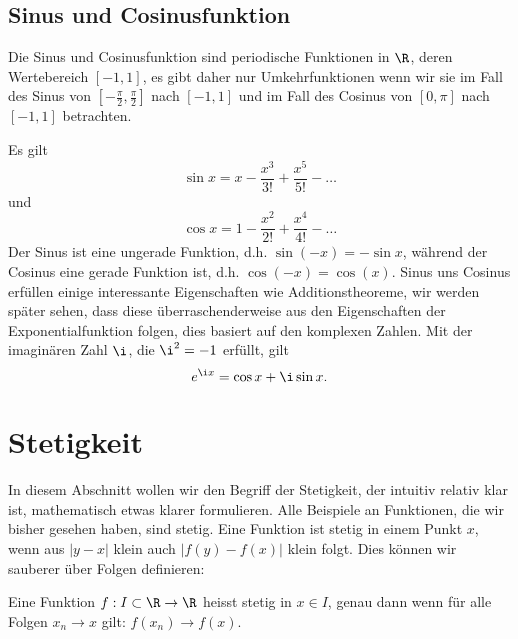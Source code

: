 \documentclass[letterpaper,10pt,english]{jupyterBook}
\begin{document}
\subsection{Sinus  und Cosinusfunktion}
\label{\detokenize{vorkurs/funktionen:sinus-und-cosinusfunktion}}
Die Sinus  und Cosinusfunktion sind periodische Funktionen in \(\R\), deren Wertebereich \([-1,1]\), es gibt daher nur Umkehrfunktionen wenn wir sie im Fall des Sinus von \([-\frac{\pi}2,\frac{\pi}2]\) nach \([-1,1]\) und im Fall des Cosinus von \([0,\pi]\) nach \([-1,1]\) betrachten.

Es gilt
\begin{equation*}
 \sin x = x - \frac{x^3}{3!} + \frac{x^5}{5!} - \ldots\end{equation*}
und
\begin{equation*}
\cos x = 1- \frac{x^2}{2!} + \frac{x^4}{4!} - \ldots\end{equation*}
Der Sinus ist eine ungerade Funktion, d.h. \(\sin (-x) = -  \sin x\), während der Cosinus eine gerade Funktion ist, d.h. \(\cos(-x) = \cos(x)\). Sinus uns Cosinus erfüllen einige interessante Eigenschaften wie Additionstheoreme, wir werden später sehen, dass diese überraschenderweise aus den Eigenschaften der Exponentialfunktion folgen, dies basiert auf den komplexen Zahlen. Mit der imaginären Zahl \(\i\), die \(\i^2 = -1\) erfüllt, gilt
\begin{equation*}
 e^{\i x}  = \cos x + \i \sin x.\end{equation*}

\section{Stetigkeit}
\label{\detokenize{vorkurs/stetigkeit:stetigkeit}}\label{\detokenize{vorkurs/stetigkeit::doc}}
In diesem Abschnitt wollen wir den Begriff der Stetigkeit, der intuitiv relativ klar ist, mathematisch etwas klarer formulieren. Alle Beispiele an Funktionen, die wir bisher gesehen haben, sind stetig. Eine Funktion ist stetig in einem Punkt \(x\), wenn aus \(|y-x|\) klein auch \(|f(y)-f(x)|\) klein folgt. Dies können wir sauberer über Folgen definieren:
\label{vorkurs/stetigkeit:definition-0}
\begin{definition}{}{}



Eine Funktion \(f: I \subset \R \rightarrow \R\) heisst stetig in \(x \in I\), genau dann wenn für alle Folgen \(x_n \rightarrow x\) gilt: \(f(x_n) \rightarrow f(x)\).
\end{definition}
\end{document}
